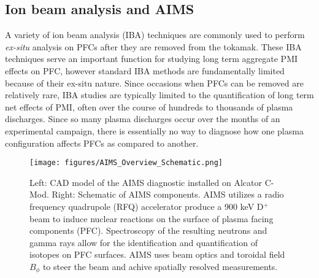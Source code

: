 \documentclass[final,3p,times,twocolumn]{elsarticle}
\begin{document}
\subsection{Ion beam analysis and AIMS}
\label{sec:AIMSOverview}

A variety of ion beam analysis (IBA) techniques are commonly used to perform \textit{ex-situ} analysis on PFCs after they are removed from the tokamak. These IBA techniques serve an important function for studying long term aggregate PMI effects on PFC, however standard IBA methods are fundamentally limited because of their ex-situ nature.  Since occasions when PFCs can be removed are relatively rare, IBA studies are typically limited to the quantification of long term net effects of PMI, often over the course of hundreds to thousands of plasma discharges.  Since so many plasma discharges occur over the months of an experimental campaign, there is essentially no way to diagnose how one plasma configuration affects PFCs as compared to another.


\begin{figure*}[h]
 \centering
  \texttt{[image: figures/AIMS\_Overview\_Schematic.png]}
 \caption{Left: CAD model of the AIMS diagnostic installed on Alcator C-Mod.  Right: Schematic of AIMS components.  AIMS utilizes a radio frequency quadrupole (RFQ) accelerator produce a 900 keV D$^+$ beam to induce nuclear reactions on the surface of plasma facing components (PFC). Spectroscopy of the resulting neutrons and gamma rays allow for the identification and quantification of isotopes on PFC surfaces.  AIMS uses beam optics and toroidal field $B_\phi$ to steer the beam and achive spatially resolved measurements.}
 \label{fig:AIMSOverviewSchematic0}
\end{figure*}

%
\end{document}
